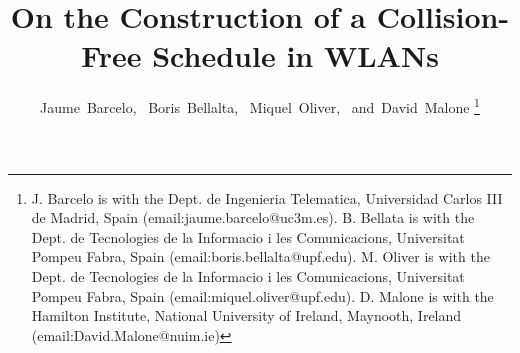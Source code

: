 \documentclass[journal]{IEEEtran}
\begin{document}
%
\title{On the Construction of a Collision-Free Schedule in WLANs}
%
%
%

\author{Jaume~Barcelo,~%
        Boris~Bellalta,~%
        Miquel~Oliver,~%
        and~David~Malone%
\thanks{J. Barcelo is with the Dept. de Ingenieria Telematica, Universidad Carlos III de Madrid, Spain (email:jaume.barcelo@uc3m.es).\newline
B. Bellata is with the Dept. de Tecnologies de la Informacio i les Comunicacions, Universitat Pompeu Fabra, Spain (email:boris.bellalta@upf.edu).\newline
M. Oliver is with the Dept. de Tecnologies de la Informacio i les Comunicacions, Universitat Pompeu Fabra, Spain (email:miquel.oliver@upf.edu).\newline
D. Malone is with the Hamilton Institute, National University of Ireland, Maynooth, Ireland (email:David.Malone@nuim.ie)}%
}


% 
%
\end{document}
